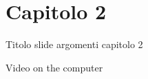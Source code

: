 
\section{Capitolo 2}

\begin{frame}{Titolo slide}
    argomenti capitolo 2

\end{frame}


\begin{frame}{Video on the computer}
    \centering
\end{frame}
